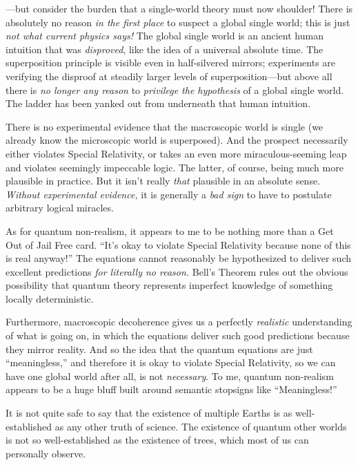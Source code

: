{
 {}---but consider the burden that a single-world theory must now
shoulder! There is absolutely no reason \textit{in the first place} to
suspect a global single world; this is just \textit{not what current
physics says!} The global single world is an ancient human intuition
that was \textit{disproved}, like the idea of a universal absolute
time. The superposition principle is visible even in half-silvered
mirrors; experiments are verifying the disproof at steadily larger
levels of superposition---but above all there is \textit{no longer any
reason} to \textit{privilege the hypothesis} of a global single world.
The ladder has been yanked out from underneath that human intuition.}

{
 There is no experimental evidence that the macroscopic world is
single (we already know the microscopic world is superposed). And the
prospect necessarily either violates Special Relativity, or takes an
even more miraculous-seeming leap and violates seemingly impeccable
logic. The latter, of course, being much more plausible in practice.
But it isn't really \textit{that} plausible in an
absolute sense. \textit{Without experimental evidence,} it is generally
a \textit{bad sign} to have to postulate arbitrary logical miracles.}

{
 As for quantum non-realism, it appears to me to be nothing more
than a Get Out of Jail Free card.
``It's okay to violate Special
Relativity because none of this is real anyway!'' The
equations cannot reasonably be hypothesized to deliver such excellent
predictions \textit{for literally no reason.} Bell's
Theorem rules out the obvious possibility that quantum theory
represents imperfect knowledge of something locally deterministic.}

{
 Furthermore, macroscopic decoherence gives us a perfectly
\textit{realistic} understanding of what is going on, in which the
equations deliver such good predictions because they mirror reality.
And so the idea that the quantum equations are just
``meaningless,'' and therefore it is
okay to violate Special Relativity, so we can have one global world
after all, is not \textit{necessary}. To me, quantum non-realism
appears to be a huge bluff built around semantic stopsigns like
``Meaningless!''}

{
 It is not quite safe to say that the existence of multiple Earths
is as well-established as any other truth of science. The existence of
quantum other worlds is not so well-established as the existence of
trees, which most of us can personally observe.}

